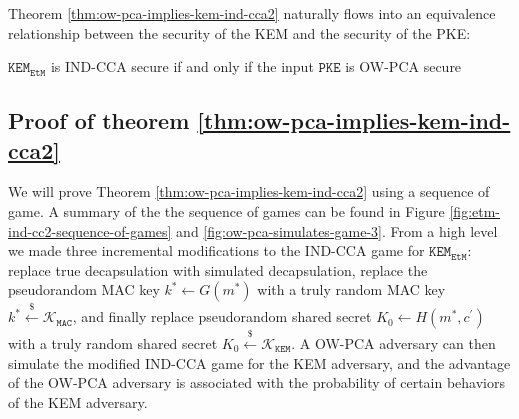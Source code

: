 \documentclass[journal=tches,submission]{iacrtrans}
\newcommand{\pke}{\texttt{PKE}}
\newcommand{\kem}{\texttt{KEM}}
\newcommand{\etm}{\texttt{EtM}}  %
\newcommand{\mac}{\texttt{MAC}}
\newcommand{\leftsample}{\stackrel{\$}{\leftarrow}}
\begin{document}
Theorem \ref{thm:ow-pca-implies-kem-ind-cca2} naturally flows into an equivalence relationship between the security of the KEM and the security of the PKE:

\begin{lemma}
    $\kem_\etm$ is IND-CCA secure if and only if the input $\pke$ is OW-PCA secure
\end{lemma}

\subsection{Proof of theorem \ref{thm:ow-pca-implies-kem-ind-cca2}}\label{sec:proof-of-theorem}
We will prove Theorem \ref{thm:ow-pca-implies-kem-ind-cca2} using a sequence of game. A summary of the the sequence of games can be found in Figure \ref{fig:etm-ind-cc2-sequence-of-games} and \ref{fig:ow-pca-simulates-game-3}. From a high level we made three incremental modifications to the IND-CCA game for $\kem_\etm$: replace true decapsulation with simulated decapsulation, replace the pseudorandom MAC key $k^\ast \leftarrow G(m^\ast)$ with a truly random MAC key $k^\ast \leftsample \mathcal{K}_\mac$, and finally replace pseudorandom shared secret $K_0 \leftarrow H(m^\ast, c^\prime)$ with a truly random shared secret $K_0 \leftsample \mathcal{K}_\kem$. A OW-PCA adversary can then simulate the modified IND-CCA game for the KEM adversary, and the advantage of the OW-PCA adversary is associated with the probability of certain behaviors of the KEM adversary.
\end{document}
